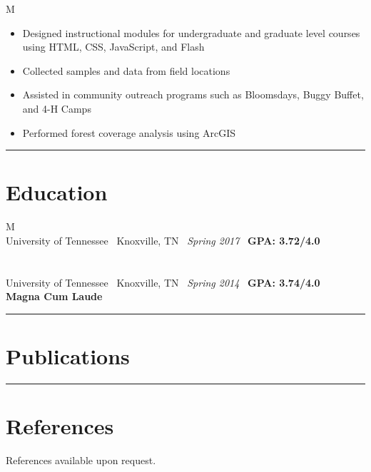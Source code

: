 \documentclass[10pt]{article}%
\begin{document}
\begin{tabularx}{\linewidth}{M}
        \begin{itemize}[topsep=-12pt,parsep=0em]
        	    \setlength\itemsep{0em}
        	    \item Designed instructional modules for undergraduate and graduate level courses using HTML, CSS, JavaScript, and Flash
        	    \item Collected samples and data from field locations
        	    \item Assisted in community outreach programs such as Bloomsdays, Buggy Buffet, and 4-H Camps
        	    \item Performed forest coverage analysis using ArcGIS
        \end{itemize}
    \end{tabularx}
\par\noindent\rule{\textwidth}{0.4pt}
\section*{\faUniversity{} Education}
     \begin{tabularx}{\linewidth}{M}%
       \\
      University of Tennessee \textemdash ~Knoxville, TN \textemdash ~\textit{Spring 2017} \textemdash ~\textbf{GPA: 3.72/4.0} \\
      \\
       \\
      University of Tennessee \textemdash ~Knoxville, TN \textemdash ~\textit{Spring 2014} \textemdash ~\textbf{GPA: 3.74/4.0} \\
      \textbf{Magna Cum Laude} \\
    \end{tabularx}%
\newpage
\par\noindent\rule{\textwidth}{0.4pt}
\section*{\faBook{} Publications}
\nocite{*}

\par\noindent\rule{\textwidth}{0.4pt}
\section*{\faUserPlus{} References}
References available upon request.
\end{document}

